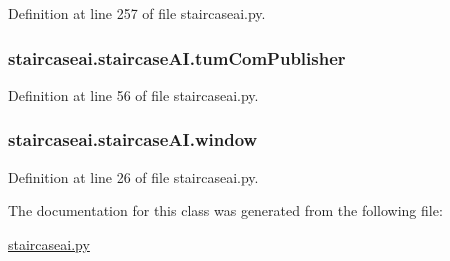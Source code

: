 Definition at line 257 of file staircaseai.\-py.

\hypertarget{classstaircaseai_1_1staircaseAI_a84126efb40c0a7d59dff2b930ec0a63c}{
\subsubsection[{tum\-Com\-Publisher}]{\setlength{\rightskip}{0pt plus 5cm}staircaseai.\-staircase\-A\-I.\-tum\-Com\-Publisher}}\label{classstaircaseai_1_1staircaseAI_a84126efb40c0a7d59dff2b930ec0a63c}


Definition at line 56 of file staircaseai.\-py.

\hypertarget{classstaircaseai_1_1staircaseAI_a95e3078cae642f3569ea7ea043cddc3f}{
\subsubsection[{window}]{\setlength{\rightskip}{0pt plus 5cm}staircaseai.\-staircase\-A\-I.\-window}}\label{classstaircaseai_1_1staircaseAI_a95e3078cae642f3569ea7ea043cddc3f}


Definition at line 26 of file staircaseai.\-py.



The documentation for this class was generated from the following file\-:\begin{DoxyCompactItemize}
\item 
\hyperlink{staircaseai_8py}{staircaseai.\-py}\end{DoxyCompactItemize}
